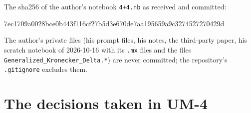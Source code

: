 \documentclass[
  10pt,
]{article}
\newenvironment{Shaded}{}{}
\newcommand{\NormalTok}[1]{#1}
\begin{document}
The sha256 of the author's notebook \texttt{4+4.nb} as received and
committed:

\begin{Shaded}
\begin{Highlighting}[]
\NormalTok{7ec1709a0028bce0b443f116cf27b5d3e670de7aa195659a9c3274527270429d}
\end{Highlighting}
\end{Shaded}

The author's private files (his prompt files, his notes, the third-party
paper, his scratch notebook of 2026-10-16 with its \texttt{.mx} files
and the files \texttt{Generalized\_Kronecker\_Delta.*}) are never
committed; the repository's \texttt{.gitignore} excludes them.

\hypertarget{the-decisions-taken-in-um-4}{%
\section{The decisions taken in
UM-4}\label{the-decisions-taken-in-um-4}}
\end{document}
